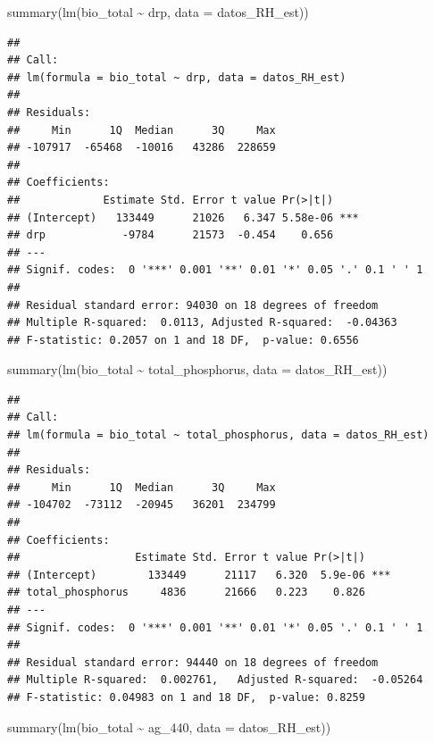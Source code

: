 \documentclass[
]{book}
\newenvironment{Shaded}{\begin{snugshade}}{\end{snugshade}}
\newcommand{\AttributeTok}[1]{\textcolor[rgb]{0.77,0.63,0.00}{#1}}
\newcommand{\FunctionTok}[1]{\textcolor[rgb]{0.00,0.00,0.00}{#1}}
\newcommand{\NormalTok}[1]{#1}
\newcommand{\SpecialCharTok}[1]{\textcolor[rgb]{0.00,0.00,0.00}{#1}}
\begin{document}
\begin{Shaded}
\begin{Highlighting}[]
\FunctionTok{summary}\NormalTok{(}\FunctionTok{lm}\NormalTok{(bio\_total }\SpecialCharTok{\textasciitilde{}}\NormalTok{ drp, }\AttributeTok{data =}\NormalTok{ datos\_RH\_est))}
\end{Highlighting}
\end{Shaded}

\begin{verbatim}
## 
## Call:
## lm(formula = bio_total ~ drp, data = datos_RH_est)
## 
## Residuals:
##     Min      1Q  Median      3Q     Max 
## -107917  -65468  -10016   43286  228659 
## 
## Coefficients:
##             Estimate Std. Error t value Pr(>|t|)    
## (Intercept)   133449      21026   6.347 5.58e-06 ***
## drp            -9784      21573  -0.454    0.656    
## ---
## Signif. codes:  0 '***' 0.001 '**' 0.01 '*' 0.05 '.' 0.1 ' ' 1
## 
## Residual standard error: 94030 on 18 degrees of freedom
## Multiple R-squared:  0.0113, Adjusted R-squared:  -0.04363 
## F-statistic: 0.2057 on 1 and 18 DF,  p-value: 0.6556
\end{verbatim}

\begin{Shaded}
\begin{Highlighting}[]
\FunctionTok{summary}\NormalTok{(}\FunctionTok{lm}\NormalTok{(bio\_total }\SpecialCharTok{\textasciitilde{}}\NormalTok{ total\_phosphorus, }\AttributeTok{data =}\NormalTok{ datos\_RH\_est))}
\end{Highlighting}
\end{Shaded}

\begin{verbatim}
## 
## Call:
## lm(formula = bio_total ~ total_phosphorus, data = datos_RH_est)
## 
## Residuals:
##     Min      1Q  Median      3Q     Max 
## -104702  -73112  -20945   36201  234799 
## 
## Coefficients:
##                  Estimate Std. Error t value Pr(>|t|)    
## (Intercept)        133449      21117   6.320  5.9e-06 ***
## total_phosphorus     4836      21666   0.223    0.826    
## ---
## Signif. codes:  0 '***' 0.001 '**' 0.01 '*' 0.05 '.' 0.1 ' ' 1
## 
## Residual standard error: 94440 on 18 degrees of freedom
## Multiple R-squared:  0.002761,   Adjusted R-squared:  -0.05264 
## F-statistic: 0.04983 on 1 and 18 DF,  p-value: 0.8259
\end{verbatim}

\begin{Shaded}
\begin{Highlighting}[]
\FunctionTok{summary}\NormalTok{(}\FunctionTok{lm}\NormalTok{(bio\_total }\SpecialCharTok{\textasciitilde{}}\NormalTok{ ag\_440, }\AttributeTok{data =}\NormalTok{ datos\_RH\_est))}
\end{Highlighting}
\end{Shaded}
\end{document}
